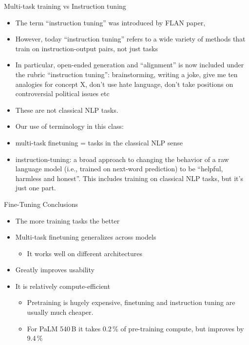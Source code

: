 \begin{frame}[allowframebreaks]{Multi-task training vs Instruction tuning}


\vfill

\begin{itemize}
\item The term ``instruction tuning'' was introduced by FLAN paper,
\item However, today ``instruction tuning'' refers to a wide
variety of methods that train on instruction-output pairs,
    not just tasks
  \item
    In particular,
open-ended generation and ``alignment'' 
is now included under
    the rubric ``instruction tuning'': brainstorming,
    writing a joke, give me ten analogies for concept X,
    don't use hate language, don't take positions on
    controversial political issues etc
\item These are not classical NLP tasks.
\item Our use of terminology in this class:
\item multi-task finetuning = tasks in the classical NLP
    sense
    \item instruction-tuning: a broad approach to changing
    the behavior of a raw language model (i.e., trained on
    next-word prediction) to be ``helpful, harmless and
    honest''. This includes training on classical NLP tasks,
    but it's just one part.
\end{itemize}

\vfill

\end{frame}


\begin{frame}{Fine-Tuning Conclusions}

\vfill

\begin{itemize}
\item 
     The more training tasks the better
\item Multi-task finetuning generalizes across models
    \begin{itemize}
    \item It works well on different architectures
    \end{itemize}
\item Greatly improves usability
\item It is relatively compute-efficient
    \begin{itemize}
    \item Pretraining is hugely expensive, finetuning and
    instruction tuning are usually much cheaper.
    \item For PaLM 540\,B it takes 0.2\,\% of pre-training compute, but improves by 9.4\,\%
    \end{itemize}
\end{itemize}

\vfill

\end{frame}

